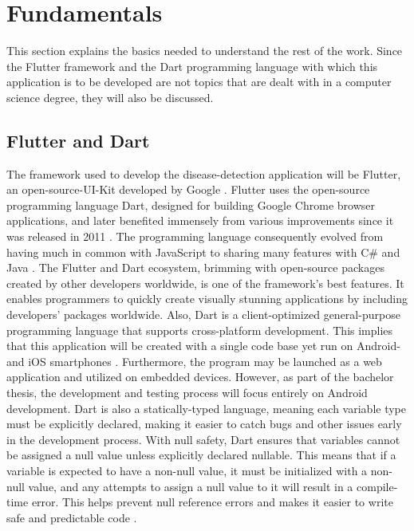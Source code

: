 \chapter{Fundamentals}
This section explains the basics needed to understand the rest of the work. Since the Flutter framework and the Dart programming language with which this application is to be developed are not topics that are dealt with in a computer science degree, they will also be discussed.

\section{Flutter and Dart}
The framework used to develop the disease-detection application will be Flutter, an open-source-UI-Kit developed by Google  \cite{.flutterDEV}. Flutter uses the open-source programming language Dart, designed for building Google Chrome browser applications, and later benefited immensely from various improvements since it was released in 2011 \cite{whatisdart}. The programming language consequently evolved from having much in common with JavaScript to sharing many features with C\# and Java \cite{.javadart}. The Flutter and Dart ecosystem, brimming with open-source packages created by other developers worldwide, is one of the framework's best features. It enables programmers to quickly create visually stunning applications by including developers' packages worldwide. Also, Dart is a client-optimized general-purpose programming language that supports cross-platform development. This implies that this application will be created with a single code base yet run on Android- and iOS smartphones \cite{.dartoverview}.
Furthermore, the program may be launched as a web application and utilized on embedded devices. However, as part of the bachelor thesis, the development and testing process will focus entirely on Android development. Dart is also a statically-typed language, meaning each variable type must be explicitly declared, making it easier to catch bugs and other issues early in the development process. With null safety, Dart ensures that variables cannot be assigned a null value unless explicitly declared nullable. This means that if a variable is expected to have a non-null value, it must be initialized with a non-null value, and any attempts to assign a null value to it will result in a compile-time error. This helps prevent null reference errors and makes it easier to write safe and predictable code \cite{.dartoverview}.

